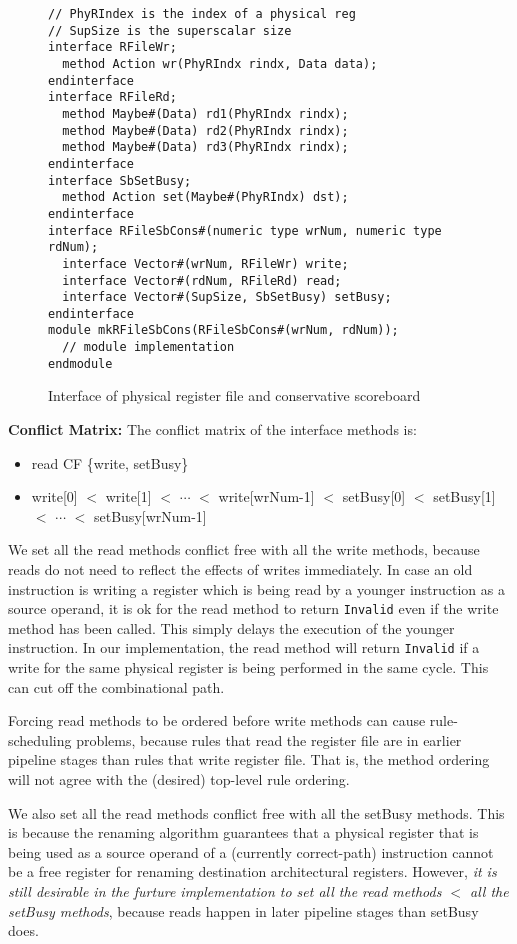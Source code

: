 \begin{figure}[!htb]
\begin{lstlisting}[caption={}]
// PhyRIndex is the index of a physical reg
// SupSize is the superscalar size
interface RFileWr;
  method Action wr(PhyRIndx rindx, Data data);
endinterface
interface RFileRd;
  method Maybe#(Data) rd1(PhyRIndx rindx);
  method Maybe#(Data) rd2(PhyRIndx rindx);
  method Maybe#(Data) rd3(PhyRIndx rindx);
endinterface
interface SbSetBusy;
  method Action set(Maybe#(PhyRIndx) dst);
endinterface
interface RFileSbCons#(numeric type wrNum, numeric type rdNum);
  interface Vector#(wrNum, RFileWr) write;
  interface Vector#(rdNum, RFileRd) read;
  interface Vector#(SupSize, SbSetBusy) setBusy;
endinterface
module mkRFileSbCons(RFileSbCons#(wrNum, rdNum));
  // module implementation
endmodule
\end{lstlisting}
\caption{Interface of physical register file and conservative scoreboard}\label{fig:prf-sb-ifc}
\end{figure}

\noindent\textbf{Conflict Matrix:}
The conflict matrix of the interface methods is:
\begin{itemize}
    \item read CF \{write, setBusy\}
    \item write[0] $<$ write[1] $<$ $\cdots$ $<$ write[wrNum-1] $<$ setBusy[0] $<$ setBusy[1] $<$ $\cdots$ $<$ setBusy[wrNum-1]
\end{itemize}
We set all the read methods conflict free with all the write methods, because reads do not need to reflect the effects of writes immediately.
In case an old instruction is writing a register which is being read by a younger instruction as a source operand, it is ok for the read method to return \texttt{Invalid} even if the write method has been called.
This simply delays the execution of the younger instruction.
In our implementation, the read method will return \texttt{Invalid} if a write for the same physical register is being performed in the same cycle.
This can cut off the combinational path.

Forcing read methods to be ordered before write methods can cause rule-scheduling problems, because rules that read the register file are in earlier pipeline stages than rules that write register file.
That is, the method ordering will not agree with the (desired) top-level rule ordering.

We also set all the read methods conflict free with all the setBusy methods.
This is because the renaming algorithm guarantees that a physical register that is being used as a source operand of a (currently correct-path) instruction cannot be a free register for renaming destination architectural registers.
However, \emph{it is still desirable in the furture implementation to set all the read methods $<$ all the setBusy methods}, because reads happen in later pipeline stages than setBusy does.

